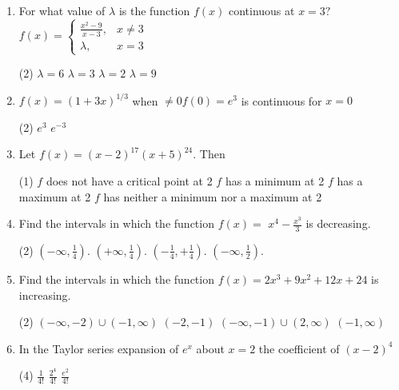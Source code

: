 \begin{enumerate}
	\item For what value of $\lambda$ is the function $f(x)$ continuous at $x=3 ?$
	$
	f(x)=\left\{\begin{aligned}
	\frac{x^{2}-9}{x-3}, & x \neq 3 \\
	\lambda, & x=3
	\end{aligned}\right.
	$
	\begin{tasks}(2)
		\task[\textbf{a.}]$\lambda=6$  
		\task[\textbf{b.}]$\lambda=3$  
		\task[\textbf{c.}]$\lambda=2$   
		\task[\textbf{d.}]$\lambda=9$   
	\end{tasks}
	\item $f(x)=(1+3 x)^{1 / 3}$ when $\neq 0 f(0)=e^{3}$ is continuous for $x=0$
	\begin{tasks}(2)
		\task[\textbf{c.}]$e^{3}$ 
		\task[\textbf{d.}]$e^{-3}$
	\end{tasks}
	\item Let $f(x)=(x-2)^{17}(x+5)^{24}$. Then
	\begin{tasks}(1)
		\task[\textbf{a.}] $f$ does not have a critical point at 2  
		\task[\textbf{b.}]$f$ has a minimum at 2
		\task[\textbf{c.}] $f$ has a maximum at 2
		\task[\textbf{d.}] $f$ has neither a minimum nor a maximum at 2
	\end{tasks}
	\item Find the intervals in which the function $f(x)=$ $x^{4}-\frac{x^{3}}{3}$ is decreasing.
	\begin{tasks}(2)
		\task[\textbf{a.}]$\left(-\infty, \frac{1}{4}\right)$.  
		\task[\textbf{b.}]$\left(+\infty, \frac{1}{4}\right)$. 
		\task[\textbf{c.}]$\left(-\frac{1}{4}, +\frac{1}{4}\right)$.  
		\task[\textbf{d.}]$\left(-\infty, \frac{1}{2}\right)$.   
	\end{tasks}
	\item Find the intervals in which the function $f(x)=2 x^{3}+9 x^{2}+12 x+24$ is increasing.
	\begin{tasks}(2)
		\task[\textbf{a.}] $(-\infty,-2) \cup(-1, \infty)$ 
		\task[\textbf{b.}]$(-2,-1)$
		\task[\textbf{c.}]$(-\infty,-1) \cup(2, \infty)$ 
		\task[\textbf{d.}]$(-1, \infty)$ 
	\end{tasks}
	\item In the Taylor series expansion of $e^{x}$ about $x=2$ the coefficient of $(x-2)^{4}$
	\begin{tasks}(4)
		\task[\textbf{a.}]$\frac{1}{4!}$  
		\task[\textbf{b.}]$\frac{2^{4}}{4!}$
		\task[\textbf{c.}]$\frac{e^{2}}{4!}$ 

\end{tasks}
\end{enumerate}

